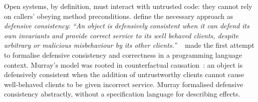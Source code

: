 





Open systems, by definition, must interact with
untrusted code: they cannot rely on callers' obeying method
preconditions. 
\cite{miller-esop2013,MillerPhD} define the necessary approach as
\textit{defensive consistency}: \textit{``An object is defensively
  consistent when it can defend its own invariants and provide correct
  service to its well behaved clients, despite arbitrary or malicious
  misbehaviour by its other clients.''}
~\cite{Murray10dphil} made the first attempt to formalise defensive consistency and
 correctness in a programming language context.  Murray's model was rooted in
counterfactual causation~\cite{Lewis_73}: an object is defensively
consistent when the addition of untrustworthy clients cannot cause
well-behaved clients to be given incorrect service.  Murray formalised
defensive consistency %
abstractly, 
without a specification language for describing effects.





